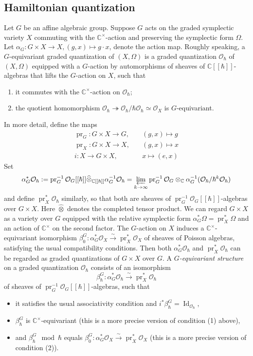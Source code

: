 \documentclass[12pt]{amsart}
\newcommand{\C}{\mathbb{C}}
\newcommand{\Id}{\operatorname{Id}}
\newcommand{\pr}{\operatorname{pr}}
\newcommand{\cm}{\C^\times}
\newcommand{\OO}{\mathcal{O}}
\theoremstyle{definition}
\numberwithin{equation}{section}
\begin{document}
\subsection{Hamiltonian quantization}\label{SS_Ham_quant}
Let $G$ be an affine algebraic group. Suppose $G$ acts on the graded symplectic variety $X$ commuting with the $\cm$-action and preserving the symplectic form $\Omega$. Let $\alpha_G: G \times X \to X, (g, x) \mapsto g \cdot x$, denote the action map. Roughly speaking, a $G$-equivariant graded quantization of $(X, \Omega)$ is a graded quantization $\OO_\hbar$ of $(X, \Omega)$ equipped with a $G$-action by automorphisms of sheaves of $\C[[\hbar]]$-algebras that lifts the $G$-action on $X$, such that
\begin{enumerate}
	\item
	it commutes with the $\cm$-action on $\OO_\hbar$;
	\item
	the quotient homomorphism $\OO_\hbar \twoheadrightarrow \OO_\hbar / \hbar \OO_\hbar \simeq \OO_X$ is $G$-equivariant.
\end{enumerate}
In more detail, define the maps
\begin{align*}
	\pr_G: G \times X \to G, & \quad (g,x) \mapsto g \\
	\pr_X: G \times X \to X, & \quad (g,x) \mapsto x \\
	i: X \to G \times X, & \quad x \mapsto (e, x)
\end{align*}
Set
\begin{equation} \label{eq:quan_pullback}
	\alpha_G^* \OO_\hbar := \pr_G^{-1}  \OO_G[[\hbar]]  \widehat{\otimes}_{\C[[\hbar]]} \alpha_G^{-1} \OO_\hbar = \varprojlim_{k \to \infty} \pr_G^{-1}  \OO_G  \otimes_\C  \alpha_G^{-1} (\OO_\hbar / \hbar^k \OO_\hbar)
\end{equation}
and define $\pr_X^* \OO_\hbar$ similarly, so that both are sheaves of $\pr_G^{-1}  \OO_G[[\hbar]]$-algebras over $G \times X$. Here $\widehat{\otimes}$ denotes the completed tensor product. We can regard $G \times X$ as a variety over $G$ equipped with the relative symplectic form $\alpha_G^* \Omega = \pr_X^* \Omega$ and an action of $\cm$ on the second factor. The $G$-action on $X$ induces a $\cm$-equivariant isomorphism $\beta_0^G: \alpha_G^* \OO_X  \xrightarrow{\sim} \pr_X^* \OO_X$ of sheaves of Poisson algebras, satisfying the usual compatibility conditions. Then both $\alpha_G^*\OO_\hbar$ and $\pr_X^*\OO_\hbar$ can be regarded as graded quantizations of $G \times X$ over $G$. A {\it $G$-equivariant structure} on a graded quantization $\OO_\hbar$ consists of an isomorphism
\[ \beta_\hbar^G: \alpha_G^* \OO_\hbar \xrightarrow{\sim} \pr_X^* \OO_\hbar \]
of sheaves of $\pr_G^{-1}  \OO_G[[\hbar]]$-algebras, such that
\begin{itemize}
\item
it satisfies the usual associativity condition and  $i^* \beta_\hbar^G = \Id_{\OO_\hbar}$, \item $\beta_\hbar^G$ is $\cm$-equivariant (this is a more precise version of condition (1) above),
\item and $\beta_\hbar^G \mod \hbar$ equals $\beta_0^G: \alpha_G^* \OO_X  \xrightarrow{\sim} \pr_X^* \OO_X$ (this is a more precise version of condition (2)).
\end{itemize}
\end{document}
